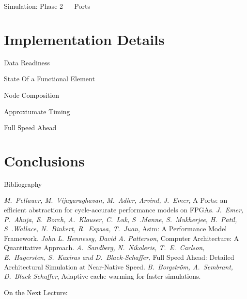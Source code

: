 \begin{frame}{Simulation: Phase 2 --- Ports}
\centering
{}
\end{frame}

\section{Implementation Details}

\begin{frame}{Data Readiness}
\centering
{}
\end{frame}

\begin{frame}{State Of a Functional Element}
\centering
{}
\end{frame}

\begin{frame}{Node Composition}
\centering
{}
\end{frame}

\begin{frame}{Approxiumate Timing}
\centering
{}
\end{frame}

\begin{frame}{Full Speed Ahead}
\centering
{}
\end{frame}

\section*{Conclusions}

\begin{frame}[allowframebreaks]{Bibliography}
\begin{thebibliography}{99}
\bibitem{} \textit{M.~Pellauer, M.~Vijayaraghavan, M.~Adler, Arvind, J.~Emer},
  A-Ports: an efficient abstraction for cycle-accurate performance models on
  FPGAs.
\bibitem{} \textit{J.~Emer, P.~Ahuja, E.~Borch, A.~Klauser, C.~Luk,
  S~.Manne, S.~Mukherjee, H.~Patil, S~.Wallace, N.~Binkert, R.~Espasa, T.~Juan},
  Asim: A Performance Model Framework.
\bibitem{} \textit{John L. Hennessy, David A. Patterson},
  Computer Architecture: A Quantitative Approach.
\bibitem{} \textit{A.~Sandberg, N.~Nikoleris, T.~E.~Carlson, E.~Hagersten,
  S.~Kaxiras and D.~Black-Schaffer}, Full Speed Ahead: Detailed Architectural
  Simulation at Near-Native Speed.
\bibitem{} \textit{B.~Borgstr\"{o}m, A.~Sembrant, D.~Black-Schaffer}, Adaptive
  cache warming for faster simulations.
\end{thebibliography}
\end{frame}

\begin{frame}{On the Next Lecture:}
\end{frame}

\finalslide


